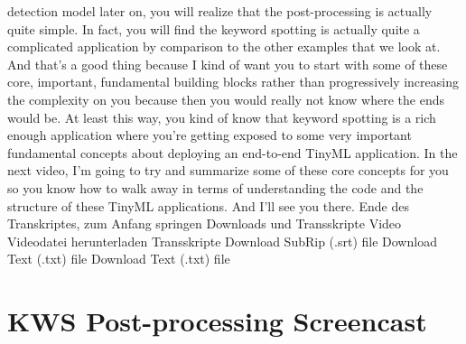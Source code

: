     detection model later on, you will realize that the post-processing
    is actually quite simple.
    In fact, you will find the keyword spotting is actually
    quite a complicated application by comparison to the other examples
    that we look at.
    And that's a good thing because I kind of
    want you to start with some of these core, important, fundamental building
    blocks rather than progressively increasing the complexity on you
    because then you would really not know where the ends would be.
    At least this way, you kind of know that keyword spotting
    is a rich enough application where you're
    getting exposed to some very important fundamental concepts
    about deploying an end-to-end TinyML application.
    In the next video, I'm going to try and summarize some of these core concepts
    for you so you know how to walk away in terms
    of understanding the code and the structure of these TinyML applications.
    And I'll see you there.
    Ende des Transkriptes, zum Anfang springen
    Downloads und Transskripte
    Video
    Videodatei herunterladen
    Transskripte
    Download SubRip (.srt) file
    Download Text (.txt) file    
    Download Text (.txt) file    
 
\section{KWS Post-processing Screencast}


